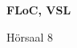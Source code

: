 \documentclass[a4paper]{article}
\begin{document}
\printGenericVSLHeader
\begin{center}
\begin{vsltext}{3cm}{4cm}

   \vspace{0.5cm} 

    \textbf{FLoC, VSL} 

    \vspace{1.5cm}

    Hörsaal 8

\end{vsltext}

\end{center}
\end{document}
